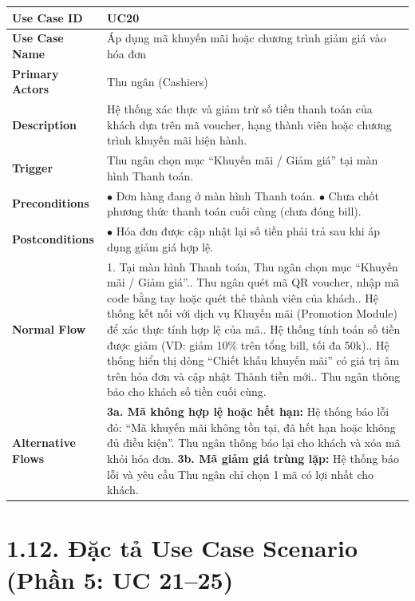 \begin{longtable}{|p{3.5cm}|p{12.5cm}|}
\hline
\textbf{Use Case ID} & UC20 \\ \hline
\textbf{Use Case Name} & Áp dụng mã khuyến mãi hoặc chương trình giảm giá vào hóa đơn \\ \hline
\textbf{Primary Actors} & Thu ngân (Cashiers) \\ \hline
\textbf{Description} & Hệ thống xác thực và giảm trừ số tiền thanh toán của khách dựa trên mã voucher, hạng thành viên hoặc chương trình khuyến mãi hiện hành. \\ \hline
\textbf{Trigger} & Thu ngân chọn mục ``Khuyến mãi / Giảm giá'' tại màn hình Thanh toán. \\ \hline
\textbf{Preconditions} &
$\bullet$ Đơn hàng đang ở màn hình Thanh toán.\newline
$\bullet$ Chưa chốt phương thức thanh toán cuối cùng (chưa đóng bill). \\ \hline
\textbf{Postconditions} & $\bullet$ Hóa đơn được cập nhật lại số tiền phải trả sau khi áp dụng giảm giá hợp lệ. \\ \hline
\textbf{Normal Flow} &
1. Tại màn hình Thanh toán, Thu ngân chọn mục ``Khuyến mãi / Giảm giá''.\newline
2. Thu ngân quét mã QR voucher, nhập mã code bằng tay hoặc quét thẻ thành viên của khách.\newline
3. Hệ thống kết nối với dịch vụ Khuyến mãi (Promotion Module) để xác thực tính hợp lệ của mã.\newline
4. Hệ thống tính toán số tiền được giảm (VD: giảm 10\% trên tổng bill, tối đa 50k).\newline
5. Hệ thống hiển thị dòng ``Chiết khấu khuyến mãi'' có giá trị âm trên hóa đơn và cập nhật Thành tiền mới.\newline
6. Thu ngân thông báo cho khách số tiền cuối cùng. \\ \hline
\textbf{Alternative Flows} &
\textbf{3a. Mã không hợp lệ hoặc hết hạn:} Hệ thống báo lỗi đỏ: ``Mã khuyến mãi không tồn tại, đã hết hạn hoặc không đủ điều kiện''. Thu ngân thông báo lại cho khách và xóa mã khỏi hóa đơn.\newline
\textbf{3b. Mã giảm giá trùng lặp:} Hệ thống báo lỗi và yêu cầu Thu ngân chỉ chọn 1 mã có lợi nhất cho khách. \\ \hline
\end{longtable}

\section*{1.12. Đặc tả Use Case Scenario (Phần 5: UC 21--25)}

